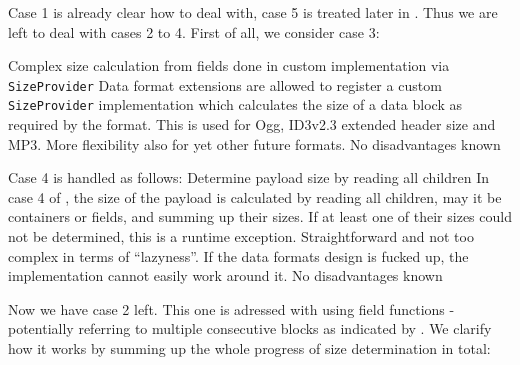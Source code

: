 Case 1 is already clear how to deal with, case 5 is treated later in . Thus we are left to deal with cases 2 to 4. First of all, we consider case 3:

{%
Complex size calculation from fields done in custom implementation via \texttt{SizeProvider}
}
{%
Data format extensions are allowed to register a custom \texttt{SizeProvider} implementation which calculates the size of a data block as required by the format. This is used for Ogg, ID3v2.3 extended header size and MP3.
}
{%
More flexibility also for yet other future formats.
}
{%
No disadvantages known
}

Case 4 is handled as follows:
{%
Determine payload size by reading all children
}
{%
In case 4 of , the size of the payload is calculated by reading all children, may it be containers or fields, and summing up their sizes. If at least one of their sizes could not be determined, this is a runtime exception.
}
{%
Straightforward and not too complex in terms of ``lazyness''. If the data formats design is fucked up, the implementation cannot easily work around it.
}
{%
No disadvantages known
}

Now we have case 2 left. This one is adressed with using field functions - potentially referring to multiple consecutive blocks as indicated by . We clarify how it works by summing up the whole progress of size determination in total:

